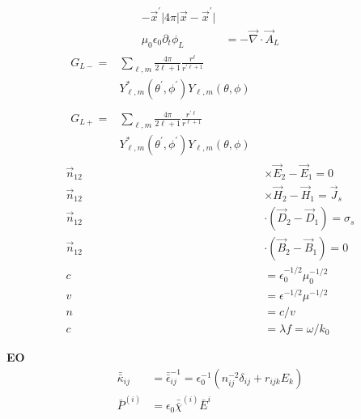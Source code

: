 \documentclass[12pt]{article}
\begin{document}
\begin{multicols}{3}
\begin{align}
{{      - \vec{x}^{\prime} \rvert}}{4\pi \lvert \vec{x} - \vec{x}^{\prime} \rvert}\\
  \mu_0 \epsilon_0 \partial_t \phi_L &= -\vec{\nabla} \cdot \vec{A}_L
\end{align}
\begin{align}
  \begin{split}
    G_{L-} = &\textstyle{\sum\limits_{\ell, m}} {}\frac{4\pi}{2\ell + 1}
    \frac{r^{\ell}}{r^{\prime \ell + 1}}\\
  &Y^{*}_{\ell, m}(\theta^{\prime}, \phi^{\prime})
  Y_{\ell, m}(\theta, \phi)
  \end{split}\\
  \begin{split}
  G_{L+} = &{}\textstyle{\sum\limits_{\ell, m}}
  \frac{4\pi}{2\ell + 1} \frac{r^{\prime \ell}}{r^{\ell + 1}}\\
  &Y^{*}_{\ell, m}(\theta^{\prime}, \phi^{\prime})
  Y_{\ell, m}(\theta, \phi)
  \end{split}\\
  \vec{n}_{12} &\times {\vec{E}_2 - \vec{E}_1} = 0\\
  \vec{n}_{12} &\times {\vec{H}_2 - \vec{H}_1} = \vec{J}_s\\
  \vec{n}_{12} &\cdot (\vec{D}_2 - \vec{D}_1) = \sigma_s\\
  \vec{n}_{12} &\cdot (\vec{B}_2 - \vec{B}_1) = 0\\
  c &= \epsilon^{-1/2}_0\mu^{-1/2}_0\\
  v &= \epsilon^{-1/2}\mu^{-1/2}\\
  n &= c/v\\
  c &= \lambda f = \omega/k_0
\end{align}

\textbf{EO}
\begin{align}
  \bar{\bar{\kappa}}_{ij} &= \bar{\bar{\epsilon}}_{ij}^{-1} = \epsilon_0^{-1} (n_{ij}^{-2} \delta_{ij} + r_{ijk} E_k)\\ %
  \bar{P}^{(i)} &= \epsilon_0 \bar{\bar{\chi}}^{(i)} \bar{E}^{i}\\
\end{align}


\end{multicols}
\end{document}
